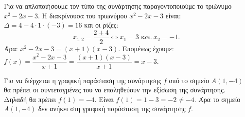 
\begin{alist}
\item Για να απλοποιήσουμε τον τύπο της συνάρτησης παραγοντοποιούμε το τριώνυμο 
$x^2 - 2x - 3$.
Η διακρίνουσα του τριωνύμου $x^2 - 2x - 3$ είναι: $\Delta = 4 - 4 \cdot 1 \cdot (-3) = 16$
και οι ρίζες: 
\[x_{1,2} = \dfrac{2 \pm 4}{2} \Leftrightarrow x_1 = 3 \text{ και } x_2 = -1.\]
Άρα: $x^2 - 2x - 3 = (x + 1)(x - 3)$.
Επομένως έχουμε: $f(x) = \dfrac{x^2 - 2x - 3}{x + 1} = \dfrac{(x + 1)(x - 3)}{x + 1} = x - 3$.

\item Για να διέρχεται η γραφική παράσταση της συνάρτησης $f$ από το σημείο $A(1, -4)$ θα
πρέπει οι συντεταγμένες του να επαληθεύουν την εξίσωση της συνάρτησης. Δηλαδή θα
πρέπει $f(1) = -4$.
Είναι $f(1) = 1 - 3 = -2 \ne -4$. Άρα το σημείο $A(1, -4)$ δεν ανήκει στη γραφική παράσταση της 
συνάρτησης $f$.
\end{alist}

